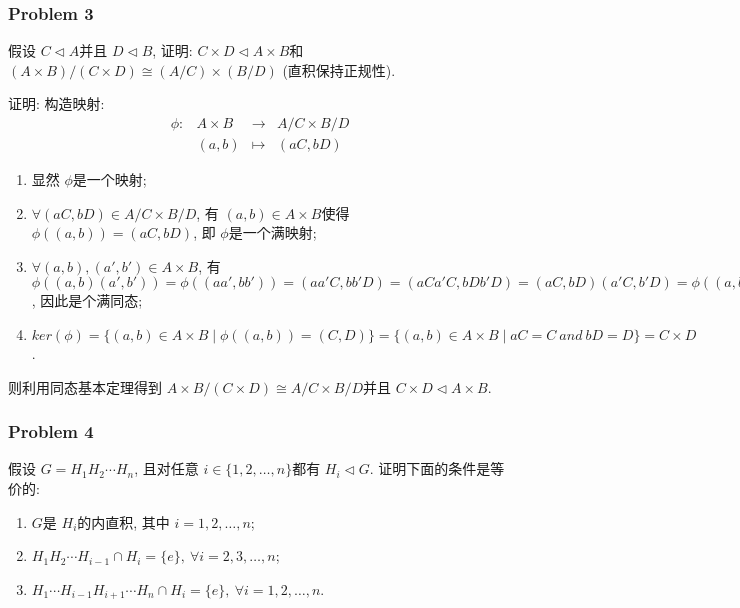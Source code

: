 \documentclass[a4paper,12pt]{ctexart}
\begin{document}
\subsubsection*{Problem 3}
    假设 $ C\triangleleft A $并且 $ D\triangleleft B $, 证明: $ C\times D\triangleleft A\times B $和 $ (A\times B)/(C\times D)\cong(A/C)\times(B/D) $ (直积保持正规性).
    
    证明: 构造映射:\[ \begin{array}{cccc}
      \phi:& A\times B&\rightarrow&A/C\times B/D\\
      &(a,b)&\mapsto&(aC,bD)
    \end{array} \]
    \begin{enumerate}
      \item 显然 $ \phi $是一个映射;
      \item $ \forall (aC,bD)\in A/C\times B/D $, 有 $ (a,b)\in A\times B $使得 $ \phi((a,b))=(aC,bD) $, 即 $ \phi $是一个满映射;
      \item $ \forall (a,b),(a',b')\in A\times B $, 有 $ \phi((a,b)(a',b'))=\phi((aa',bb'))=(aa'C,bb'D)=(aCa'C,bDb'D)=(aC,bD)(a'C,b'D)=\phi((a,b))\phi((a',b')) $, 因此是个满同态;
      \item $ ker(\phi)=\{(a,b)\in A\times B\mid \phi((a,b))=(C,D)\}=\{(a,b)\in A\times B\mid aC=C~and~bD=D\}=C\times D $.
    \end{enumerate}
    则利用同态基本定理得到 $ A\times B/(C\times D)\cong A/C\times B/D $并且 $ C\times D\triangleleft A\times B $.
\subsubsection*{Problem 4}
    假设 $ G=H_1H_2\cdots H_n $, 且对任意 $ i\in\{1,2,\dots,n\} $都有 $ H_i\triangleleft G $. 证明下面的条件是等价的:
    \begin{enumerate}
      \item $ G $是 $ H_i $的内直积, 其中 $ i=1,2,\dots,n $;
      \item $ H_1H_2\cdots H_{i-1}\cap H_i=\{e\},~\forall i=2,3,\dots,n $;
      \item $ H_1\cdots H_{i-1}H_{i+1}\cdots H_n\cap H_i=\{e\},~\forall i=1,2,\dots,n $.
    \end{enumerate}
\end{document}
